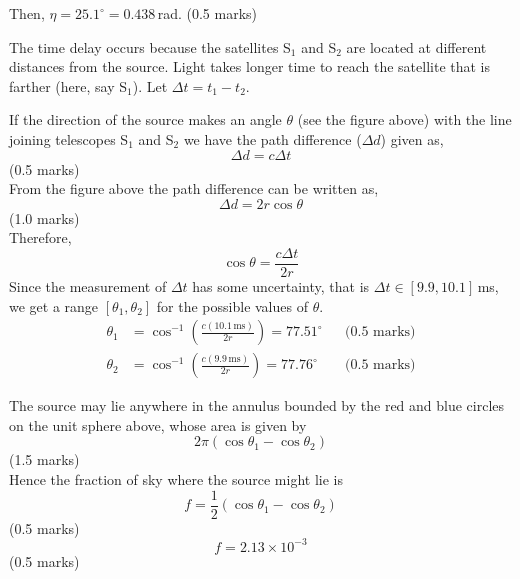 \begin{description}
Then, $\eta = 25.1^\circ = 0.438$\,rad. \hfill(0.5 marks)

\item[(T01.2)]
The time delay occurs because the satellites S$_1$ and S$_2$ are located at
different distances from the source. Light takes longer time to reach the
satellite that is farther (here, say S$_1$). Let $\Delta t = t_1 - t_2$.


If the direction of the source makes an angle $\theta$ (see the figure
above) with the line joining telescopes S$_1$ and S$_2$ we have the path
difference ($\Delta d$) given as,
\[ \Delta d = c\Delta t \]
\hfill(0.5 marks)\\
From the figure above the path difference can be written as,
\[ \Delta d = 2r\cos\theta \]
\hfill(1.0 marks)\\
Therefore,
\[ \cos\theta = \frac{c\Delta t}{2r} \]
Since the measurement of $\Delta t$ has some uncertainty, that is
$\Delta t \in [9.9, 10.1]$\,ms, we get a range $[\theta_1, \theta_2]$ for the
possible values of $\theta$.
\begin{align*}
\theta_1 &= \cos^{-1}\left(\frac{c(10.1\,\mathrm{ms})}{2r}\right)
  = 77.51^\circ
  && \text{(0.5 marks)} \\
\theta_2 &= \cos^{-1}\left(\frac{c(9.9\,\mathrm{ms})}{2r}\right)
  = 77.76^\circ
  && \text{(0.5 marks)}
\end{align*}


The source may lie anywhere in the annulus bounded by the red and blue
circles on the unit sphere above, whose area is given by
\[ 2\pi(\cos\theta_1 - \cos\theta_2) \]
\hfill(1.5 marks)\\
Hence the fraction of sky where the source might lie is
\[ f = \frac{1}{2}(\cos\theta_1 - \cos\theta_2) \]
\hfill(0.5 marks)
\[ f = 2.13 \times 10^{-3} \]
\hfill(0.5 marks)
\end{description}
